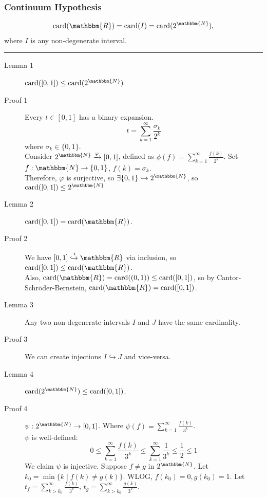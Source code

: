 \documentclass[10pt]{extarticle}
\newcommand{\card}{\text{card}}
\newcommand{\N}{\mathbbm{N}}
\newcommand{\R}{\mathbbm{R}}
\begin{document}
      \subsubsection{Continuum Hypothesis}%
      \begin{align*}
        \card(\R) = \card(I) = \card(2^{\N}), 
      \end{align*}
      where $I$ is any non-degenerate interval.\\
      \vspace{4pt}
      \rule{\textwidth}{0.4pt}
      \vspace{4pt}
    \begin{description}
      \item[Lemma 1] $\card([0,1]) \leq \card(2^{\N})$.
      \item[Proof 1] Every $t\in [0,1]$ has a binary expansion.
        \[
          t = \sum_{k = 1}^{\infty} \frac{\sigma_k}{2^k}
        \] 
        where $\sigma_k \in \{0,1\}$. \\

        Consider $2^{\N} \xrightarrow{\varphi} [0,1]$, defined as $\displaystyle \phi(f) = \sum_{k=1}^{\infty}\frac{f(k)}{2^k}$. Set $f: \N \rightarrow \{0,1\}$, $f(k) = \sigma_k$.\\

          Therefore, $\varphi$ is surjective, so $\exists \{0,1\}\hookrightarrow 2^{\N}$, so $\card([0,1]) \leq 2^{\N}$
        \item[Lemma 2] $\card([0,1]) = \card(\R)$.
        \item[Proof 2] We have $[0,1]\xhookrightarrow{i} \R$ via inclusion, so $\card([0,1])\leq \card(\R)$.\\

          Also, $\card(\R) = \card((0,1)) \leq \card([0,1])$, so by Cantor-Schröder-Bernstein, $\card(\R) = \card([0,1])$.
        \item[Lemma 3] Any two non-degenerate intervals $I$ and $J$ have the same cardinality. 
        \item[Proof 3] We can create injections $I\hookrightarrow J$ and vice-versa.
        \item[Lemma 4] $\card(2^{\N}) \leq \card([0,1])$.
        \item[Proof 4] $\psi: 2^{\N} \rightarrow [0,1]$. Where $\psi(f) = \sum_{k = 1}^{\infty}\frac{f(k)}{3^k}$.\\

          $\psi$ is well-defined:
          \[
            0\leq \sum_{k=1}^{\infty}\frac{f(k)}{3^k} \leq \sum_{k=1}^{\infty}\frac{1}{3^k} \leq \frac{1}{2} \leq 1
          \] 
          We claim $\psi$ is injective. Suppose $f\neq g$ in $2^{\N}$. Let $k_0 = \min\{k\mid f(k) \neq g(k)\}$. WLOG, $f(k_0) = 0, g(k_0) = 1$. Let $t_f = \sum_{k>k_0}^{\infty}\frac{f(k)}{3^k}$, $t_g = \sum_{k>k_0}^{\infty}\frac{g(k)}{3^k}$.\\


\end{description}
\end{document}
